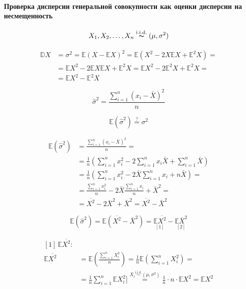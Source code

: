 \documentclass[
  letterpaper,
]{scrbook}
\let\oldparagraph\paragraph
\renewcommand{\paragraph}[1]{\oldparagraph{#1}\mbox{}}
\newcommand{\lp}{\left(}
\newcommand{\rp}{\right)}
\newcommand{\expect}{\mathbb{E}}
\newcommand{\disp}{\mathbb{D}}
\newcommand{\iid}{\text{i.i.d.}}
\theoremstyle{definition}
\theoremstyle{remark}
\begin{document}
\paragraph{Проверка дисперсии генеральной совокупности как оценки
дисперсии на
несмещенность}\label{ux43fux440ux43eux432ux435ux440ux43aux430-ux434ux438ux441ux43fux435ux440ux441ux438ux438-ux433ux435ux43dux435ux440ux430ux43bux44cux43dux43eux439-ux441ux43eux432ux43eux43aux443ux43fux43dux43eux441ux442ux438-ux43aux430ux43a-ux43eux446ux435ux43dux43aux438-ux434ux438ux441ux43fux435ux440ux441ux438ux438-ux43dux430-ux43dux435ux441ux43cux435ux449ux435ux43dux43dux43eux441ux442ux44c}

\[ 
X_1, X_2, \dots , X_n \overset{\iid}{\thicksim} (\mu, \sigma^2)
\]

\[
\begin{split}
\disp X & = \sigma^2 = \expect(X - \expect X)^2 = \expect (X^2 - 2 X \expect X + \expect^2 X) = \\
& = \expect X^2 - 2\expect X \expect X + \expect^2 X = \expect X^2 - 2\expect^2 X + \expect^2 X = \\
& = \expect X^2 - \expect^2 X
\end{split}
\]

\[
\hat \sigma^2 = \frac{\sum_{i=1}^n (x_i - \bar X)^2}{n}
\]

\[
\expect (\hat \sigma^2) \overset{?}{=} \sigma^2
\]

\[
\begin{split}
\expect (\hat \sigma^2) & = \frac{\sum_{i=1}^n (x_i - \bar X)^2}{n} = \\
& = \frac{1}{n} \lp \sum_{i=1}^n x_i^2 - 2 \sum_{i=1}^n x_i \bar X  + \sum_{i=1}^n \bar X \rp \\ 
& = \frac{1}{n} \lp \sum_{i=1}^n x_i^2 - 2 \bar X \sum_{i=1}^n x_i + n \bar X \rp = \\
& = \frac{\sum_{i=1}^n x_i^2}{n} - 2 \bar X \frac{\sum_{i=1}^n x_i}{n} + \bar X^2 = \\
& = \overline{X^2} - 2 \bar X^2 + \bar X^2 = \overline{X^2} - \bar X^2
\end{split}
\]

\[
\expect (\hat \sigma^2) = \expect (\overline {X^2} - \bar X^2) = \underset{[1]}{\expect \overline{X^2}} - \underset{[2]}{\expect \bar X^2}
\]

\[
\begin{split}
[1] \, \expect \overline{X^2} : & \\
\expect \overline{X^2} & = \expect \lp \frac{\sum_{i=1}^n X_i^2}{n} \rp = \frac{1}{n} \expect \lp \sum_{i=1}^n X_i^2 \rp = \\
& = \frac{1}{n} \sum_{i=1}^n \expect X_i^2] \overset{X_i \overset{\iid}{\sim} (\mu, \sigma^2)}{=} \frac{1}{n} \cdot n \cdot \expect X^2 = \expect X^2
\end{split}
\]
\end{document}
